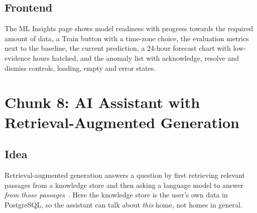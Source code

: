 \documentclass[12pt,a4paper,oneside]{report}
\begin{document}
\subsection{Frontend}
The ML Insights page shows model readiness with progress towards the required amount of data, a Train button with a time-zone choice, the evaluation metrics next to the baseline, the current prediction, a 24-hour forecast chart with low-evidence hours hatched, and the anomaly list with acknowledge, resolve and dismiss controls, loading, empty and error states.

\section{Chunk 8: AI Assistant with Retrieval-Augmented Generation}
\subsection{Idea}
Retrieval-augmented generation answers a question by first retrieving relevant passages from a knowledge store and then asking a language model to answer \emph{from those passages}~\cite{lewis2020rag}. Here the knowledge store is the user's own data in PostgreSQL, so the assistant can talk about \emph{this} home, not homes in general.
\end{document}
